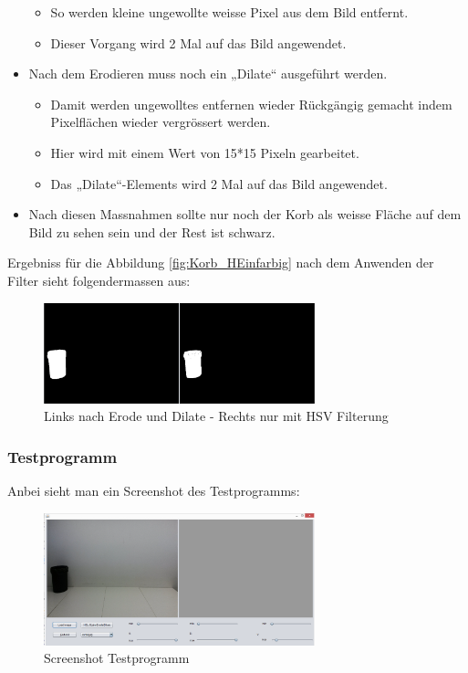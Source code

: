 \begin{itemize}
\begin{itemize}
		\item So werden kleine ungewollte weisse Pixel aus dem Bild entfernt.
		\item Dieser Vorgang wird 2 Mal auf das Bild angewendet.
	\end{itemize}
	\item Nach dem Erodieren muss noch ein „Dilate“ ausgeführt werden.
	\begin{itemize}
		\item Damit werden ungewolltes entfernen wieder Rückgängig gemacht indem Pixelflächen wieder vergrössert werden.
		\item Hier wird mit einem Wert von 15*15 Pixeln gearbeitet.
		\item Das „Dilate“-Elements wird 2 Mal auf das Bild angewendet.
	\end{itemize}
	\item Nach diesen Massnahmen sollte nur noch der Korb als weisse Fläche auf dem Bild zu sehen sein und der Rest ist schwarz.
\end{itemize}

Ergebniss für die Abbildung \ref{fig:Korb_HEinfarbig} nach dem Anwenden der Filter sieht folgendermassen aus:

\begin{figure}[h!]
	\centering
	\includegraphics[width=0.7\textwidth]{fig/Korberkennung1.png}
	\caption{Links nach Erode und Dilate - Rechts nur mit HSV Filterung}
	\label{fig:Korb_Erkennung}
\end{figure}

\subsubsection{Testprogramm}
Anbei sieht man ein Screenshot des Testprogramms:
\begin{figure}[h!]
	\centering
	\includegraphics[width=0.7\textwidth]{fig/Testprogramm.png}
	\caption{Screenshot Testprogramm}
	\label{fig:Korb_Testprogramm}
\end{figure}

